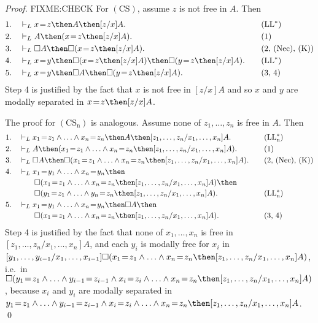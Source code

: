 \documentclass[11pt]{woarticle}
\theoremstyle{break}
\theoremstyle{nonumberplain}
\newcommand{\1}{\;\,|\;\,}
\newcommand{\T}[1]{\ensuremath{(\mathrm{ #1})}}
\begin{document}
\begin{proof}
  FIXME:CHECK
  For \T{CS}, assume $z$ is not free in $A$. Then
  \begin{alignat*}{2}
    1.\quad & \vdash_L x\!=\!z \then A \then [z/x]A. &\quad& 
              \text{\T{LL^*}}\\
    2.\quad & \vdash_L A \then (x\!=\!z \then [z/x]A). && \text{(1)}\\
    3.\quad & \vdash_L \Box A \then \Box (x\!=\!z \then [z/x]A). && \text{(2, \T{Nec}, \T{K})}\\
    4.\quad & \vdash_L x\!=\!y \then \Box (x\!=\!z \then [z/x]A) \then 
              \Box (y\!=\!z \then [z/x]A). && \text{\T{LL^*}}\\
    5.\quad & \vdash_L x\!=\!y \then \Box A \then \Box (y\!=\!z \then [z/x]A). && \text{(3, 4)}
  \end{alignat*}
  Step 4 is justified by the fact that $x$ is not free in $[z/x]A$ and
  so $x$ and $y$ are modally separated in $x\!=\!z \then [z/x]A$.

  The proof for \T{CS_n} is analogous. Assume none of $z_1,\ldots,z_n$
  is free in $A$. Then
  \begin{alignat*}{2}
    1.\quad & \vdash_L x_1\!=\!z_1 \land \ldots \land x_n\!=\!z_n \then
    A \then [z_1,\ldots,z_n/x_1,\ldots,x_n]A. &\quad& \text{\T{LL_n^*}}\\
    2.\quad & \vdash_L A \then (x_1\!=\!z_1\land\ldots\land x_n\!=\!z_n
    \then [z_1,\ldots,z_n/x_1,\ldots,x_n]A). && \text{(1)}\\
    3.\quad & \vdash_L \Box A \then \Box (x_1\!=\!z_1 \land\ldots\land
    x_n\!=\!z_n \then [z_1,\ldots,z_n/x_1,\ldots,x_n]A). 
    && \text{(2, \T{Nec}, \T{K})}\\
    4.\quad & \vdash_L x_1\!=\!y_1 \land \ldots \land x_n\!=\!y_n \then &&\\[-0.2ex]
     &\quad\quad \Box (x_1\!=\!z_1 \land\ldots\land x_n\!=\!z_n \then
     [z_1,\ldots,z_n/x_1,\ldots,x_n]A) \then &&\\[-0.2ex]
     &\quad\quad \Box (y_1\!=\!z_1\land\ldots\land y_n\!=\!z_n \then 
     [z_1,\ldots,z_n/x_1,\ldots,x_n]A). && \text{\T{LL^*_n}}\\
    5.\quad & \vdash_L x_1\!=\!y_1 \land\ldots\land x_n\!=\!y_n \then 
    \Box A \then &&\\[-0.2ex]
     &\quad\quad \Box (x_1\!=\!z_1 \land\ldots\land
     x_n\!=\!z_n \then [z_1,\ldots,z_n/x_1,\ldots,x_n]A). && \text{(3, 4)}
  \end{alignat*}
  Step 4 is justified by the fact that none of $x_1,\ldots,x_n$ is
  free in $[z_1,\ldots,z_n/x_1,\ldots,x_n]A$, and each $y_i$ is
  modally free for $x_i$ in
  $[y_1,\ldots,y_{i-1}/x_1,\ldots,x_{i-1}]\Box(x_1\!=\!z_1 \land
  \ldots\land x_n\!=\!z_n \then [z_1,\ldots,z_n/x_1,\ldots,x_n]A)$,
  i.e.\ in $\Box(y_1\!=\!z_1 \land \ldots\land y_{i-1}\!=\!z_{i-1}
  \land x_i\!=\!z_i \land \ldots\land x_n\!=\!z_n \then
  [z_1,\ldots,z_n/x_1,\ldots,x_n]A)$, because $x_i$ and $y_i$ are
  modally separated in $y_1\!=\!z_1 \land \ldots\land y_{i-1}\!=\!z_{i-1}
  \land x_i\!=\!z_i \land \ldots\land x_n\!=\!z_n \then
  [z_1,\ldots,z_n/x_1,\ldots,x_n]A$. \qed
\end{proof}
\end{document}
